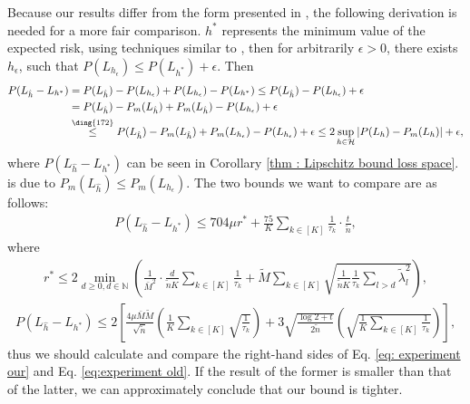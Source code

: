 \documentclass{article}
\def\sN{\mathbb{N}}
\def\leqone{\overset{\text{\ding{172}}}{\leq}}
\begin{document}
Because our results differ from the form presented in \cite{wu2023macro-auc}, the following derivation is needed for a more fair comparison. 
$h^*$ represents the minimum value of the expected risk, using techniques similar to \cite{mohri2018foundations}, then for arbitrarily $ \epsilon >0$, there exists $ h_{\epsilon}$, such that $P(L_{h_\epsilon}) \leq P(L_{h^*}) + \epsilon$. Then
\begin{align*}
    P(L_{\hat{h}} - L_{h^*}) & = P(L_{\hat{h}}) - P(L_{h_\epsilon}) + P(L_{h_\epsilon}) - P(L_{h^*}) 
     \leq P(L_{\hat{h}}) - P(L_{h_\epsilon}) + \epsilon \\
    & = P(L_{\hat{h}}) - P_m(L_{\hat{h}}) + P_m(L_{\hat{h}}) - P(L_{h_\epsilon}) +\epsilon \\
    & \leqone P(L_{\hat{h}}) - P_m(L_{\hat{h}}) + P_m(L_{h_\epsilon}) - P(L_{h_\epsilon}) +\epsilon 
     \leq 2 \sup_{h \in \mathcal{H}} |P(L_h) - P_m (L_h)| +\epsilon ,
\end{align*}
where $P(L_{\hat{h}} - L_{h^*})$ can be seen in Corollary \ref{thm : Lipschitz bound loss space}.  is due to $P_m(L_{\hat{h}}) \leq P_m(L_{h_\epsilon})$. The two bounds we want to compare are as follows:
\begin{align} \label{eq: experiment our}
    P(L_{\hat{h}} - L_{h^*}) \leq 704 \mu r^* +  \frac{75}{K} \sum_{k \in [K]} \frac{1}{\tau_k} \cdot \frac{t}{\tilde{n}},
\end{align}
where 
\begin{align} \label{eqappendix:the value of r}
    r^* \leq 2 \min_{d \geq 0, d \in \sN} ( \frac{1}{\bar{M}^2} \cdot \frac{d}{\tilde{n} K} \sum_{k \in [K]} \frac{1}{\tau_k} + \widetilde{M} \sum_{k \in [K]}\sqrt{\frac{1}{\tilde{n} K}  \frac{1}{\tau_k} \sum_{l > d} \widetilde{\lambda}_l^2 } ),
\end{align}
\begin{align} \label{eq:experiment old}
    P(L_{\hat{h}} - L_{h^*}) \leq 2 \left[ \frac{4 \mu \bar{M} \widetilde{M}}{\sqrt{\tilde{n}}} \left(\frac{1}{K} \sum_{k \in [K]}\sqrt{\frac{1}{\tau_k}}\right) + 3 \sqrt{\frac{\log 2 +t}{2 \tilde{n}}} \left(\sqrt{\frac{1}{K} \sum_{k \in [K]}\frac{1}{\tau_k}}\right) \right], 
\end{align}
thus we should calculate and compare the right-hand sides of Eq. \eqref{eq: experiment our} and Eq. \eqref{eq:experiment old}. If the result of the former is smaller than that of the latter, we can approximately conclude that our bound is tighter.
\end{document}
